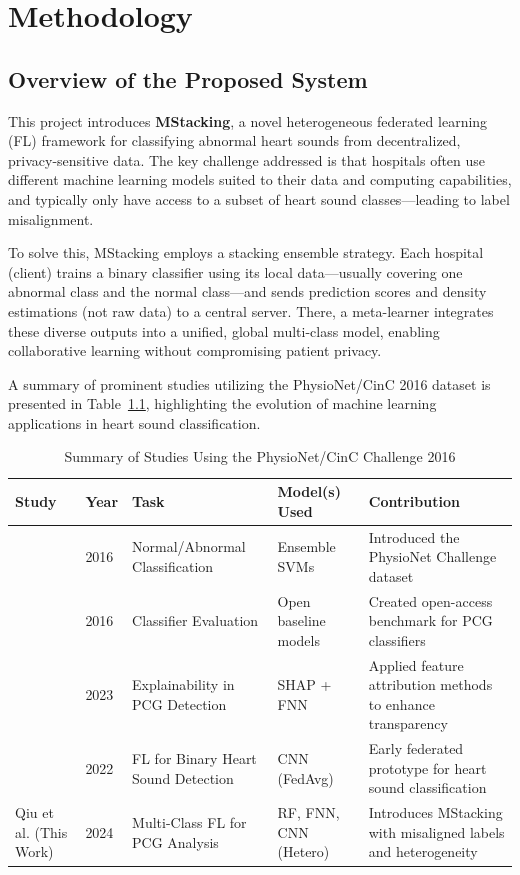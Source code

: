 \chapter{Methodology}
\section{Overview of the Proposed System}


This project introduces \textbf{MStacking}, a novel heterogeneous federated learning (FL) framework for classifying abnormal heart sounds from decentralized, privacy-sensitive data. The key challenge addressed is that hospitals often use different machine learning models suited to their data and computing capabilities, and typically only have access to a subset of heart sound classes—leading to label misalignment.

To solve this, MStacking employs a stacking ensemble strategy. Each hospital (client) trains a binary classifier using its local data—usually covering one abnormal class and the normal class—and sends prediction scores and density estimations (not raw data) to a central server. There, a meta-learner integrates these diverse outputs into a unified, global multi-class model, enabling collaborative learning without compromising patient privacy.

A summary of prominent studies utilizing the PhysioNet/CinC 2016 dataset is presented in Table~\ref{tab:physionet_summary}, highlighting the evolution of machine learning applications in heart sound classification.

\begin{table}[h]
\centering
\caption{Summary of Studies Using the PhysioNet/CinC Challenge 2016}
\label{tab:physionet_summary}
\begin{tabular}{|p{3.5cm}|p{1.5cm}|p{3.5cm}|p{3cm}|p{4cm}|}
\hline
\textbf{Study} & \textbf{Year} & \textbf{Task} & \textbf{Model(s) Used} & \textbf{Contribution} \\
\hline
\cite{clifford2016classification} & 2016 & Normal/Abnormal Classification & Ensemble SVMs & Introduced the PhysioNet Challenge dataset \\
\hline
\cite{liu2016open} & 2016 & Classifier Evaluation & Open baseline models & Created open-access benchmark for PCG classifiers \\
\hline
\cite{wang2023explainability} & 2023 & Explainability in PCG Detection & SHAP + FNN & Applied feature attribution methods to enhance transparency \\
\hline
\cite{qiu2022fl} & 2022 & FL for Binary Heart Sound Detection & CNN (FedAvg) & Early federated prototype for heart sound classification \\
\hline
Qiu et al. (This Work) & 2024 & Multi-Class FL for PCG Analysis & RF, FNN, CNN (Hetero) & Introduces MStacking with misaligned labels and heterogeneity \\
\hline
\end{tabular}
\end{table}

